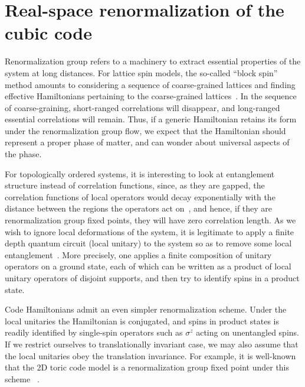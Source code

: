 \section{Real-space renormalization of the cubic code}
\label{sec:real-space-RG-CubicCode}

Renormalization group refers to a machinery 
to extract essential properties of the system at long distances.
For lattice spin models, the so-called ``block spin'' method amounts to
considering a sequence of coarse-grained lattices
and finding effective Hamiltonians pertaining to the coarse-grained lattices~\cite{Wilson1975RG,Kadanoff1977RG}.
In the sequence of coarse-graining, short-ranged correlations will disappear,
and long-ranged essential correlations will remain.
Thus, if a generic Hamiltonian retains its form under the renormalization group flow,
we expect that the Hamiltonian should represent a proper phase of matter,
and can wonder about universal aspects of the phase.

For topologically ordered systems,
it is interesting to look at entanglement structure instead of correlation functions,
since, as they are gapped, the correlation functions of local operators would decay 
exponentially with the distance between the regions the operators act on~\cite{HastingsKoma2006CorDecay},
and hence, if they are renormalization group fixed points, they will have zero correlation length.
As we wish to ignore local deformations of the system,
it is legitimate to apply a finite depth quantum circuit (local unitary) to the system
so as to remove some local
entanglement~\cite{VerstraeteCiracLatorreEtAl2005Renormalization,
Vidal2007ER,AguadoVidal2007Entanglement,Vidal2008class,ChenGuWen2010transformation}.
More precisely, one applies a finite composition of unitary operators on a ground state,
each of which can be written as a product of local unitary operators of disjoint supports,
and then try to identify spins in a product state.

Code Hamiltonians admit an even simpler renormalization scheme.
Under the local unitaries the Hamiltonian is conjugated,
and spins in product states is readily identified by single-spin operators
such as $\sigma^z$ acting on unentangled spins.
If we restrict ourselves to translationally invariant case,
we may also assume that the local unitaries obey the translation invariance.
For example, it is well-known that the 2D toric code model
is a renormalization group fixed point under this scheme%
~\cite{AguadoVidal2007Entanglement}.

